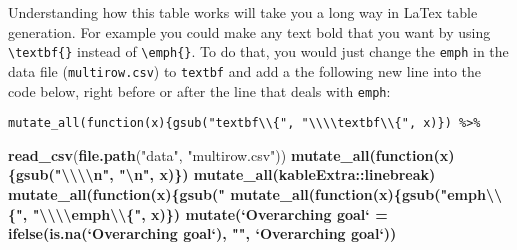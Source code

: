 \documentclass[12pt]{article}\usepackage[]{graphicx}\usepackage[]{color}
\newenvironment{Shaded}{}{}
\newcommand{\KeywordTok}[1]{\textcolor[rgb]{0.00,0.44,0.13}{\textbf{{#1}}}}
\newcommand{\DataTypeTok}[1]{\textcolor[rgb]{0.56,0.13,0.00}{{#1}}}
\newcommand{\CharTok}[1]{\textcolor[rgb]{0.25,0.44,0.63}{{#1}}}
\newcommand{\StringTok}[1]{\textcolor[rgb]{0.25,0.44,0.63}{{#1}}}
\newcommand{\NormalTok}[1]{{#1}}
\newcommand{\OperatorTok}[1]{\textcolor[rgb]{0.00,0.44,0.13}{\textbf{{#1}}}}
\newcommand{\ControlFlowTok}[1]{\textcolor[rgb]{0.00,0.44,0.13}{\textbf{{#1}}}}
\begin{document}
Understanding how this table works will take you a long way in LaTex table generation. For example you could make any text bold that you want by using \texttt{\textbackslash{}textbf\{\}} instead of \texttt{\textbackslash{}emph\{\}}. To do that, you would just change the \texttt{emph} in the data file (\texttt{multirow.csv}) to \texttt{textbf} and add a the following new line into the code below, right before or after the line that deals with \texttt{emph}:

\texttt{mutate\_all(function(x)\{gsub("textbf\textbackslash{}\textbackslash{}\{",\ "\textbackslash{}\textbackslash{}\textbackslash{}\textbackslash{}textbf\textbackslash{}\textbackslash{}\{",\ x)\})\ \%\textgreater{}\%}
\begin{Shaded}
\begin{Highlighting}[]
\KeywordTok{read_csv}\NormalTok{(}\KeywordTok{file.path}\NormalTok{(}\StringTok{"data"}\NormalTok{, }\StringTok{"multirow.csv"}\NormalTok{)) }\OperatorTok{%>%}\StringTok{ }
\StringTok{  }\KeywordTok{mutate_all}\NormalTok{(}\ControlFlowTok{function}\NormalTok{(x)\{}\KeywordTok{gsub}\NormalTok{(}\StringTok{"}\CharTok{\textbackslash{}\textbackslash{}\textbackslash{}\textbackslash{}}\StringTok{n"}\NormalTok{, }\StringTok{"}\CharTok{\textbackslash{}n}\StringTok{"}\NormalTok{, x)\}) }\OperatorTok{%>%}\StringTok{ }
\StringTok{  }\KeywordTok{mutate_all}\NormalTok{(kableExtra}\OperatorTok{::}\NormalTok{linebreak) }\OperatorTok{%>%}
\StringTok{  }\KeywordTok{mutate_all}\NormalTok{(}\ControlFlowTok{function}\NormalTok{(x)\{}\KeywordTok{gsub}\NormalTok{(}\StringTok{"%"}\NormalTok{, }\StringTok{"}\CharTok{\textbackslash{}\textbackslash{}\textbackslash{}\textbackslash{}}\StringTok{%"}\NormalTok{, x)\}) }\OperatorTok{%>%}\StringTok{ }
\StringTok{  }\KeywordTok{mutate_all}\NormalTok{(}\ControlFlowTok{function}\NormalTok{(x)\{}\KeywordTok{gsub}\NormalTok{(}\StringTok{"emph}\CharTok{\textbackslash{}\textbackslash{}}\StringTok{\{"}\NormalTok{, }\StringTok{"}\CharTok{\textbackslash{}\textbackslash{}\textbackslash{}\textbackslash{}}\StringTok{emph}\CharTok{\textbackslash{}\textbackslash{}}\StringTok{\{"}\NormalTok{, x)\}) }\OperatorTok{%>%}\StringTok{ }
\StringTok{  }\KeywordTok{mutate}\NormalTok{(}\StringTok{`}\DataTypeTok{Overarching goal}\StringTok{`}\NormalTok{ =}\StringTok{ }\KeywordTok{ifelse}\NormalTok{(}\KeywordTok{is.na}\NormalTok{(}\StringTok{`}\DataTypeTok{Overarching goal}\StringTok{`}\NormalTok{),}
                                     \StringTok{""}\NormalTok{,}
                                     \StringTok{`}\DataTypeTok{Overarching goal}\StringTok{`}\NormalTok{)) }\OperatorTok{%>%}\StringTok{ }
}}}}}}
\end{Highlighting}
\end{Shaded}
\end{document}
